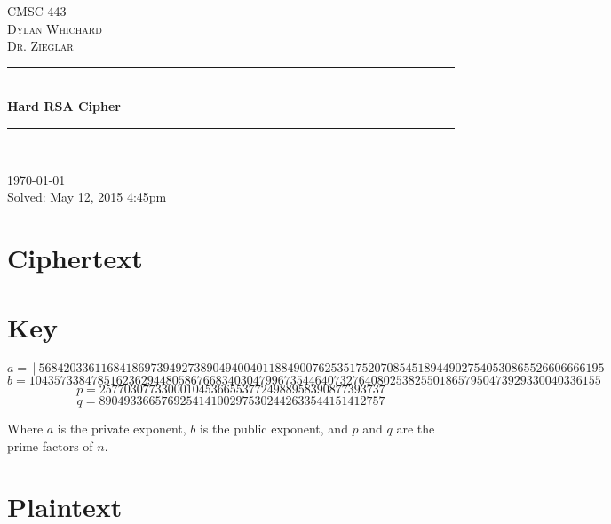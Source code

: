 \documentclass[10pt]{article}
\begin{document}
\begin{titlepage}
\begin{center}
\textsc{\LARGE CMSC 443}\\[.5cm]
\textsc{\Large Dylan Whichard}\\[.5cm]
\textsc{\Large Dr. Zieglar}\\[.4cm]

\rule{\linewidth}{.05mm} \\[0.4cm]

{\huge \bfseries Hard RSA Cipher}\\[.4cm]
\rule{\linewidth}{.05mm} \\[0.4cm]

\vfill

{\large \today}\\
{\large Solved: May 12, 2015 4:45pm}

\end{center}
\end{titlepage}

\section{Ciphertext}
\paragraph{}
\small{\texttt{}}

\section{Key}
\paragraph{}
\[a = │5684203361168418697394927389049400401188490076253517520708545189449027540530865526606666195\]
\[b = 10435733847851623629448058676683403047996735446407327640802538255018657950473929330040336155\]
\[p = 2577030773300010453665537724988958390877393737\]
\[q = 8904933665769254141002975302442633544151412757\]

Where \(a\) is the private exponent, \(b\) is the public exponent, and \(p\) and \(q\) are the prime factors of \(n\).

\section{Plaintext}
\paragraph{}
\texttt{}
\end{document}
